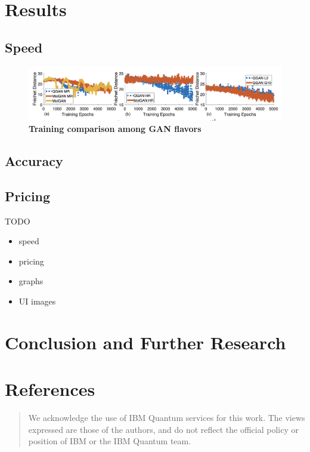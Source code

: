 \documentclass{scrartcl}
\begin{document}
\section{Results}
\label{sec:orge78210e}

\subsection{Speed}
\label{sec:org4e2791a}

\begin{figure}[htbp]
\centering
\includegraphics[width=.9\linewidth]{./assets/quganresults.png}
\caption{\textbf{Training comparison among GAN flavors}}
\end{figure}

\subsection{Accuracy}
\label{sec:org076936d}

\subsection{Pricing}
\label{sec:org7784919}

TODO
\begin{itemize}
\item speed
\item pricing
\item graphs
\item UI images
\end{itemize}

\section{Conclusion and Further Research}
\label{sec:org4df47fe}

\section{References}
\label{sec:orge3d6667}

\printbibliography

\begin{quote}
We acknowledge the use of IBM Quantum services for this work. The views expressed are those of the authors, and do not reflect the official policy or position of IBM or the IBM Quantum team.
\end{quote}
\end{document}
